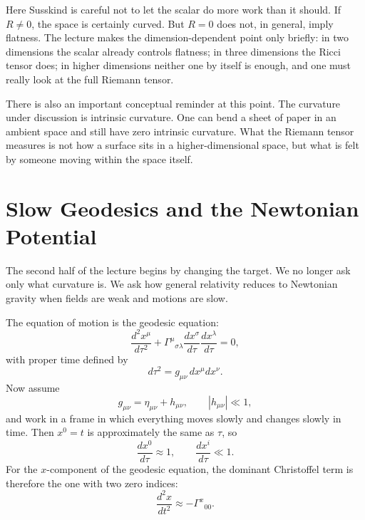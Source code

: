 Here Susskind is careful not to let the scalar do more work than it should. If \(R\neq 0\), the space is certainly curved. But \(R=0\) does not, in general, imply flatness. The lecture makes the dimension-dependent point only briefly: in two dimensions the scalar already controls flatness; in three dimensions the Ricci tensor does; in higher dimensions neither one by itself is enough, and one must really look at the full Riemann tensor.

There is also an important conceptual reminder at this point. The curvature under discussion is intrinsic curvature. One can bend a sheet of paper in an ambient space and still have zero intrinsic curvature. What the Riemann tensor measures is not how a surface sits in a higher-dimensional space, but what is felt by someone moving within the space itself.

\section{Slow Geodesics and the Newtonian Potential}

The second half of the lecture begins by changing the target. We no longer ask only what curvature is. We ask how general relativity reduces to Newtonian gravity when fields are weak and motions are slow.

The equation of motion is the geodesic equation:
\begin{equation}
\frac{d^2 x^\mu}{d\tau^2}
+
\Gamma^\mu{}_{\sigma\lambda}
\frac{dx^\sigma}{d\tau}
\frac{dx^\lambda}{d\tau}
=
0,
\end{equation}
with proper time defined by
\begin{equation}
d\tau^2 = g_{\mu\nu}\,dx^\mu dx^\nu.
\end{equation}
Now assume
\begin{equation}
g_{\mu\nu} = \eta_{\mu\nu}+h_{\mu\nu},
\qquad
|h_{\mu\nu}|\ll 1,
\end{equation}
and work in a frame in which everything moves slowly and changes slowly in time. Then \(x^0=t\) is approximately the same as \(\tau\), so
\begin{equation}
\frac{dx^0}{d\tau}\approx 1,
\qquad
\frac{dx^i}{d\tau}\ll 1.
\end{equation}
For the \(x\)-component of the geodesic equation, the dominant Christoffel term is therefore the one with two zero indices:
\begin{equation}
\frac{d^2x}{dt^2} \approx -\Gamma^x{}_{00}.
\end{equation}

